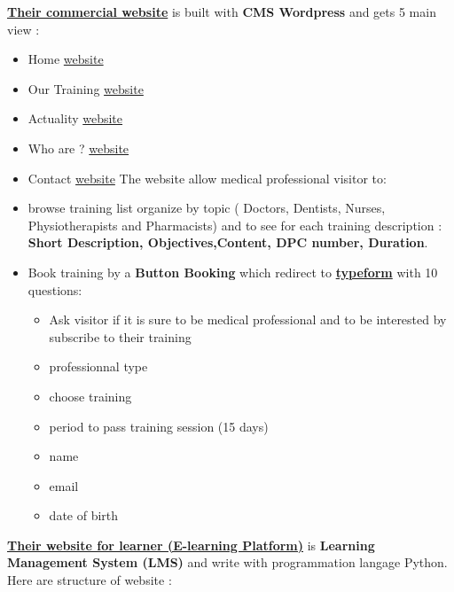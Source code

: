 \documentclass[
  12pt,
]{article}
\providecommand{\tightlist}{%
  \setlength{\itemsep}{0pt}\setlength{\parskip}{0pt}}
\begin{document}
\textbf{\href{https://eronsante.com/qui-sommes-nous-notre-organisation/}{Their
commercial website}} is built with \textbf{CMS Wordpress} and gets 5
main view :

\begin{itemize}
\tightlist
\item
  Home \href{https://eronsante.com/}{website}
\item
  Our Training \href{https://eronsante.com/nos-formations/}{website}
\item
  Actuality \href{https://eronsante.com/actualites/}{website}
\item
  Who are ? \href{https://eronsante.com/qui-sommes-nous/}{website}
\item
  Contact \href{https://eronsante.com/contact-service-client/}{website}
  The website allow medical professional visitor to:
\item
  browse training list organize by topic ( Doctors, Dentists, Nurses,
  Physiotherapists and Pharmacists) and to see for each training
  description : \textbf{Short Description, Objectives,Content, DPC
  number, Duration}.
\item
  Book training by a \textbf{Button Booking} which redirect to
  \textbf{\href{https://erons.typeform.com/to/g5qYvNaf}{typeform}} with
  10 questions:

  \begin{itemize}
  \tightlist
  \item
    Ask visitor if it is sure to be medical professional and to be
    interested by subscribe to their training
  \item
    professionnal type
  \item
    choose training
  \item
    period to pass training session (15 days)
  \item
    name
  \item
    email
  \item
    date of birth
  \end{itemize}
\end{itemize}

\textbf{\href{https://eronsante.com/qui-sommes-nous-notre-organisation/}{Their
website for learner (E-learning Platform)}} is \textbf{Learning
Management System (LMS)} and write with programmation langage Python.
Here are structure of website :
\end{document}

